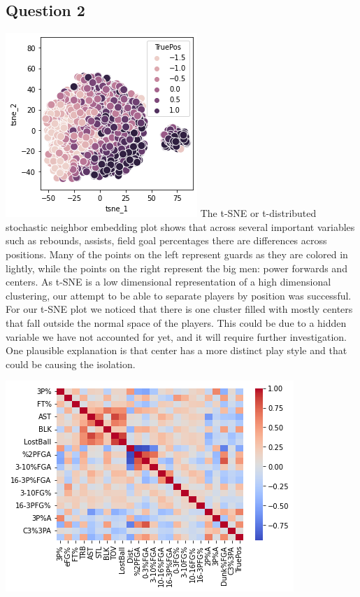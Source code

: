 \documentclass[12pt, letterpaper, titlepage]{article}
\begin{document}
\subsection{Question 2}
\includegraphics{tSNE}
The t-SNE or t-distributed stochastic neighbor embedding plot shows that across several
important variables such as rebounds, assists, field goal percentages there are differences across positions.  Many of the points on the left represent guards as they are colored in
lightly, while the points on the right represent the big men: power forwards and
centers. As t-SNE is a low dimensional representation of a high dimensional clustering,
our attempt to be able to separate players by position was successful. For our t-SNE
plot we noticed that there is one cluster filled with mostly centers that fall outside
the normal space of the players. This could be due to a hidden variable we have not
accounted for yet, and it will require further investigation. One plausible explanation is that center has a more distinct play style and that could be causing the isolation.


\includegraphics{heatmap}
\end{document}
